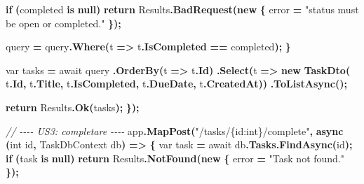 \documentclass[
  italian,
  10pt,
]{book}
\newenvironment{Shaded}{\begin{snugshade}}{\end{snugshade}}
\newcommand{\CommentTok}[1]{\textcolor[rgb]{0.56,0.35,0.01}{\textit{#1}}}
\newcommand{\DataTypeTok}[1]{\textcolor[rgb]{0.13,0.29,0.53}{#1}}
\newcommand{\FunctionTok}[1]{\textcolor[rgb]{0.13,0.29,0.53}{\textbf{#1}}}
\newcommand{\KeywordTok}[1]{\textcolor[rgb]{0.13,0.29,0.53}{\textbf{#1}}}
\newcommand{\NormalTok}[1]{#1}
\newcommand{\OperatorTok}[1]{\textcolor[rgb]{0.81,0.36,0.00}{\textbf{#1}}}
\newcommand{\StringTok}[1]{\textcolor[rgb]{0.31,0.60,0.02}{#1}}
\begin{document}
\begin{Shaded}
\begin{Highlighting}[]
        \KeywordTok{if} \OperatorTok{(}\NormalTok{completed }\KeywordTok{is} \KeywordTok{null}\OperatorTok{)}
            \KeywordTok{return}\NormalTok{ Results}\OperatorTok{.}\FunctionTok{BadRequest}\OperatorTok{(}\KeywordTok{new} \OperatorTok{\{}\NormalTok{ error }\OperatorTok{=} \StringTok{"status must be \textquotesingle{}open\textquotesingle{} or \textquotesingle{}completed\textquotesingle{}."} \OperatorTok{\});}

\NormalTok{        query }\OperatorTok{=}\NormalTok{ query}\OperatorTok{.}\FunctionTok{Where}\OperatorTok{(}\NormalTok{t }\OperatorTok{=\textgreater{}}\NormalTok{ t}\OperatorTok{.}\FunctionTok{IsCompleted} \OperatorTok{==}\NormalTok{ completed}\OperatorTok{);}
    \OperatorTok{\}}

    \DataTypeTok{var}\NormalTok{ tasks }\OperatorTok{=}\NormalTok{ await query}
        \OperatorTok{.}\FunctionTok{OrderBy}\OperatorTok{(}\NormalTok{t }\OperatorTok{=\textgreater{}}\NormalTok{ t}\OperatorTok{.}\FunctionTok{Id}\OperatorTok{)}
        \OperatorTok{.}\FunctionTok{Select}\OperatorTok{(}\NormalTok{t }\OperatorTok{=\textgreater{}} \KeywordTok{new} \FunctionTok{TaskDto}\OperatorTok{(}
\NormalTok{            t}\OperatorTok{.}\FunctionTok{Id}\OperatorTok{,}
\NormalTok{            t}\OperatorTok{.}\FunctionTok{Title}\OperatorTok{,}
\NormalTok{            t}\OperatorTok{.}\FunctionTok{IsCompleted}\OperatorTok{,}
\NormalTok{            t}\OperatorTok{.}\FunctionTok{DueDate}\OperatorTok{,}
\NormalTok{            t}\OperatorTok{.}\FunctionTok{CreatedAt}\OperatorTok{))}
        \OperatorTok{.}\FunctionTok{ToListAsync}\OperatorTok{();}

    \KeywordTok{return}\NormalTok{ Results}\OperatorTok{.}\FunctionTok{Ok}\OperatorTok{(}\NormalTok{tasks}\OperatorTok{);}
\OperatorTok{\});}

\CommentTok{// {-}{-}{-}{-} US3: completare {-}{-}{-}{-}}
\NormalTok{app}\OperatorTok{.}\FunctionTok{MapPost}\OperatorTok{(}\StringTok{"/tasks/\{id:int\}/complete"}\OperatorTok{,} \FunctionTok{async} \OperatorTok{(}\DataTypeTok{int}\NormalTok{ id}\OperatorTok{,}\NormalTok{ TaskDbContext db}\OperatorTok{)} \OperatorTok{=\textgreater{}}
\OperatorTok{\{}
    \DataTypeTok{var}\NormalTok{ task }\OperatorTok{=}\NormalTok{ await db}\OperatorTok{.}\FunctionTok{Tasks}\OperatorTok{.}\FunctionTok{FindAsync}\OperatorTok{(}\NormalTok{id}\OperatorTok{);}
    \KeywordTok{if} \OperatorTok{(}\NormalTok{task }\KeywordTok{is} \KeywordTok{null}\OperatorTok{)}
        \KeywordTok{return}\NormalTok{ Results}\OperatorTok{.}\FunctionTok{NotFound}\OperatorTok{(}\KeywordTok{new} \OperatorTok{\{}\NormalTok{ error }\OperatorTok{=} \StringTok{"Task not found."} \OperatorTok{\});}


\end{Highlighting}
\end{Shaded}
\end{document}
